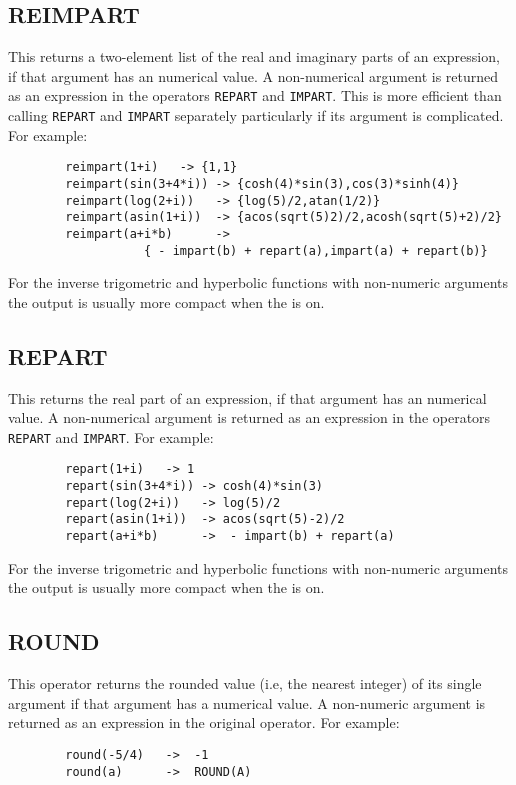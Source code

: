 \subsection{REIMPART}
\hypertarget{operator:REIMPART}{}
This returns a two-element list of the real and imaginary parts of an
expression, if that argument has an
numerical value.  A non-numerical argument is returned as an expression in
the operators \texttt{REPART} and \texttt{IMPART}.
This is more efficient than calling \texttt{REPART} and \texttt{IMPART}
separately particularly if its argument is complicated.
For example:
\begin{verbatim}
        reimpart(1+i)   -> {1,1}
        reimpart(sin(3+4*i)) -> {cosh(4)*sin(3),cos(3)*sinh(4)}
        reimpart(log(2+i))   -> {log(5)/2,atan(1/2)}
        reimpart(asin(1+i))  -> {acos(sqrt(5)2)/2,acosh(sqrt(5)+2)/2}
        reimpart(a+i*b)      ->
                   { - impart(b) + repart(a),impart(a) + repart(b)}
\end{verbatim}

For the inverse trigometric and hyperbolic functions with non-numeric arguments the output is usually more compact when the  is on.

\subsection{REPART}
\hypertarget{operator:REPART}{}
This returns the real part of an expression, if that argument has an
numerical value.  A non-numerical argument is returned as an expression in
the operators \texttt{REPART} and \texttt{IMPART}.
For example:
\begin{verbatim}
        repart(1+i)   -> 1
        repart(sin(3+4*i)) -> cosh(4)*sin(3)
        repart(log(2+i))   -> log(5)/2
        repart(asin(1+i))  -> acos(sqrt(5)-2)/2
        repart(a+i*b)      ->  - impart(b) + repart(a)
\end{verbatim}

For the inverse trigometric and hyperbolic functions with non-numeric arguments the output is usually more compact when the  is on.

\subsection{ROUND}
\hypertarget{operator:ROUND}{}
This operator returns the rounded value (i.e, the nearest integer) of its
single argument if that argument has a numerical value.  A non-numeric
argument is returned as an expression in the original operator.  For
example:
\begin{verbatim}
        round(-5/4)   ->  -1
        round(a)      ->  ROUND(A)
\end{verbatim}

